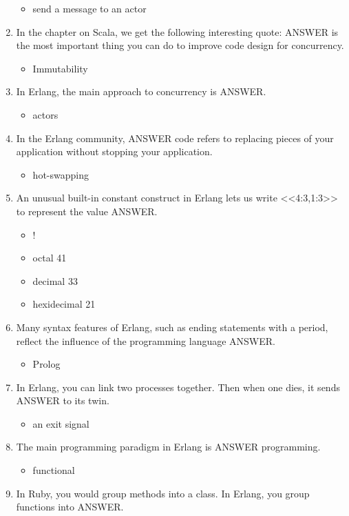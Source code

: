\documentclass{exam}
\begin{document}
\begin{enumerate}
\begin{itemize}
\item send a message to an actor
\end{itemize}
\item In the chapter on Scala, we get the following interesting quote: ANSWER is the most important thing you can do to improve code design for concurrency.
\begin{itemize}
\item Immutability
\end{itemize}
\item In Erlang, the main approach to concurrency is ANSWER.
\begin{itemize}
\item actors
\end{itemize}
\item In the Erlang community, ANSWER code refers to replacing pieces of your application without stopping your application.
\begin{itemize}
\item hot-swapping
\end{itemize}
\item An unusual built-in constant construct in Erlang lets us write <<4:3,1:3>> to represent the value ANSWER.
\begin{itemize}
\item !
\item octal 41
\item decimal 33
\item hexidecimal 21
\end{itemize}
\item Many syntax features of Erlang, such as ending statements with a period, reflect the influence of the programming language ANSWER.
\begin{itemize}
\item Prolog
\end{itemize}
\item In Erlang, you can link two processes together.  Then when one dies, it sends ANSWER to its twin.
\begin{itemize}
\item an exit signal
\end{itemize}
\item The main programming paradigm in Erlang is ANSWER programming.
\begin{itemize}
\item functional
\end{itemize}
\item In Ruby, you would group methods into a class.  In Erlang, you group functions into ANSWER.

\end{enumerate}
\end{document}
